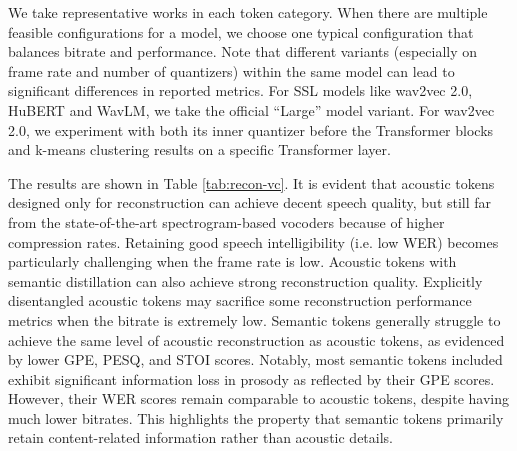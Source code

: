 We take representative works in each token category. 
When there are multiple feasible configurations for a model, we choose one typical configuration that balances bitrate and performance.
Note that different variants (especially on frame rate and number of quantizers) within the same model can lead to significant differences in reported metrics.
For SSL models like wav2vec 2.0, HuBERT and WavLM, we take the official ``Large'' model variant.
For wav2vec 2.0, we experiment with both its inner quantizer before the Transformer blocks and k-means clustering results on a specific Transformer layer.

The results are shown in Table \ref{tab:recon-vc}.
It is evident that acoustic tokens designed only for reconstruction can achieve decent speech quality, but still far from the state-of-the-art spectrogram-based vocoders because of higher compression rates.
Retaining good speech intelligibility (i.e. low WER) becomes particularly challenging when the frame rate is low. 
Acoustic tokens with semantic distillation can also achieve strong reconstruction quality.
Explicitly disentangled acoustic tokens may sacrifice some reconstruction performance metrics when the bitrate is extremely low.
Semantic tokens generally struggle to achieve the same level of acoustic reconstruction as acoustic tokens, as evidenced by lower GPE, PESQ, and STOI scores.
Notably, most semantic tokens included exhibit significant information loss in prosody as reflected by their GPE scores.
However, their WER scores remain comparable to acoustic tokens, despite having much lower bitrates.
This highlights the property that semantic tokens primarily retain content-related information rather than acoustic details.



